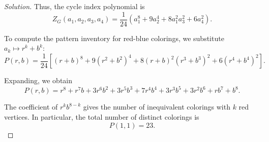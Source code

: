 \documentclass[12pt]{amsart}
\newenvironment{solution}
{\begin{proof}[Solution]}
{\end{proof}}
\begin{document}
\begin{onehalfspace}
\begin{solution}
            Thus, the cycle index polynomial is
            \[
                Z_G(a_1,a_2,a_3,a_4)
                =
                \frac{1}{24}
                \left(
                a_1^8
                + 9a_2^4
                + 8a_1^2 a_3^2
                + 6a_4^2
                \right).
            \]

            To compute the pattern inventory for red-blue colorings, we substitute $a_k \mapsto r^k + b^k$:
            \[
                P(r,b)
                =
                \frac{1}{24}\left[
                    (r+b)^8
                    + 9(r^2+b^2)^4
                    + 8(r+b)^2 (r^3+b^3)^2
                    + 6(r^4+b^4)^2
                    \right].
            \]

            Expanding, we obtain
            \[
                P(r,b)
                =
                r^8 + r^7 b + 3r^6 b^2 + 3r^5 b^3 + 7r^4 b^4
                + 3r^3 b^5 + 3r^2 b^6 + r b^7 + b^8.
            \]

            The coefficient of $r^k b^{8-k}$ gives the number of inequivalent colorings with $k$ red vertices.
            In particular, the total number of distinct colorings is
            \[
                P(1,1) = 23.
            \]
        \end{solution}
    \end{onehalfspace}
\end{document}
